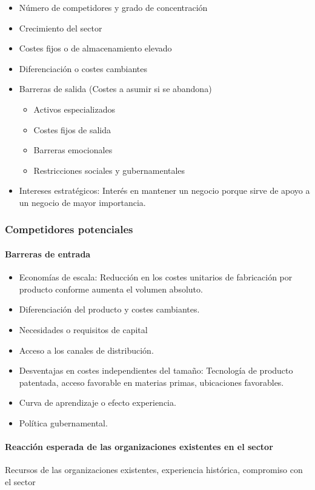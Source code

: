 \documentclass[12pt]{article}
\theoremstyle{definition_wo_parentheses}
\begin{document}
\begin{itemize}
\item Número de competidores y grado de concentración
\item Crecimiento del sector
\item Costes fijos o de almacenamiento elevado
\item Diferenciación o costes cambiantes
\item Barreras de salida (Costes a asumir si se abandona)
	\begin{itemize}
	\item Activos especializados
	\item Costes fijos de salida
	\item Barreras emocionales
	\item Restricciones sociales y gubernamentales
	\end{itemize}
\item Intereses estratégicos: Interés en mantener un negocio porque sirve de apoyo a un negocio de mayor importancia.

\end{itemize}

\subsubsection{Competidores potenciales}

\paragraph{Barreras de entrada}
\begin{itemize}
\item Economías de escala: Reducción en los costes unitarios de fabricación por producto conforme aumenta el volumen absoluto.
\item Diferenciación del producto y costes cambiantes.
\item Necesidades o requisitos de capital
\item Acceso a los canales de distribución.
\item Desventajas en costes independientes del tamaño: Tecnología de producto patentada, acceso favorable en materias primas, ubicaciones favorables.
\item Curva de aprendizaje o efecto experiencia.
\item Política gubernamental.
\end{itemize}

\paragraph{Reacción esperada de las organizaciones existentes en el sector} Recursos de las organizaciones existentes, experiencia histórica, compromiso con el sector
\end{document}
